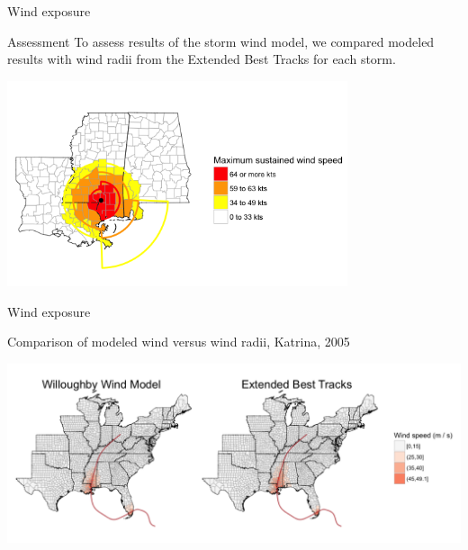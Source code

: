 \documentclass[ignorenonframetext,]{beamer}
\begin{document}
\begin{frame}{Wind exposure}

\begin{block}{Assessment}
To assess results of the storm wind model, we compared modeled results with wind radii from the Extended Best Tracks for each storm. 
\end{block}

\vspace{-0.5cm}

\begin{center}\includegraphics[width=0.75\textwidth]{ext_tracks_2} \end{center}

\end{frame}

\begin{frame}{Wind exposure}

\begin{center}
Comparison of modeled wind versus wind radii, Katrina, 2005
\end{center}

\vspace{-1cm}

\begin{flushleft}\includegraphics[width=1.08\textwidth]{wind_model_eval_katrina_2005} \end{flushleft}

\end{frame}
\end{document}
